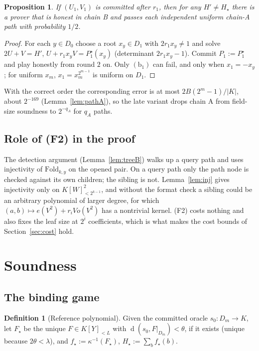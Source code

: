 \documentclass[11pt]{article}
\newtheorem{proposition}[theorem]{Proposition}
\theoremstyle{definition}
\newtheorem{definition}[theorem]{Definition}
\newcommand{\K}{K}
\newcommand{\Fold}{\mathrm{Fold}}
\DeclareMathOperator{\dist}{d}
\begin{document}
\begin{proposition}\label{prop:late}
If $(U_1,V_1)$ is committed after $r_1$, then for any $H'\ne H_\star$ there is a prover that is honest in chain B and passes each independent uniform chain-A path with probability $1/2$.
\end{proposition}
\begin{proof}
For each $y\in D_0$ choose a root $x_y\in D_1$ with $2r_1x_y\ne1$ and solve $2U+V=H'$, $U+r_1x_yV=P_1^\star(x_y)$ (determinant $2r_1x_y-1$). Commit $P_1:=P_1^\star$ and play honestly from round $2$ on. Only $(\mathrm b_1)$ can fail, and only when $x_1=-x_y$; for uniform $x_m$, $x_1=x_m^{2^{m-1}}$ is uniform on $D_1$.
\end{proof}
With the correct order the corresponding error is at most $2B(2^m-1)/|\K|$, about $2^{-169}$ (Lemma~\ref{lem:pathA}), so the late variant drops chain A from field-size soundness to $2^{-q_A}$ for $q_A$ paths.

\subsection{Role of (F2) in the proof}
The detection argument (Lemma~\ref{lem:treeB}) walks up a query path and uses injectivity of $\Fold_{k,y}$ on the opened pair. On a query path only the path node is checked against its own children; the sibling is not. Lemma~\ref{lem:inj} gives injectivity only on $\K[W]_{<2^{k-1}}^2$, and without the format check a sibling could be an arbitrary polynomial of larger degree, for which $(a,b)\mapsto e(V^2)+r_iVo(V^2)$ has a nontrivial kernel. (F2) costs nothing and also fixes the leaf size at $2^i$ coefficients, which is what makes the cost bounds of Section~\ref{sec:cost} hold.

\section{Soundness}\label{sec:sound}

\subsection{The binding game}

\begin{definition}[Reference polynomial]
Given the committed oracle $s_0:D_m\to\K$, let $F_\star$ be the unique $F\in\K[Y]_{<L}$ with $\dist(s_0,F|_{D_m})<\theta$, if it exists (unique because $2\theta<\lambda$), and $f_\star:=\kappa^{-1}(F_\star)$, $H_\star:=\sum_bf_\star(b)$.
\end{definition}
\end{document}
